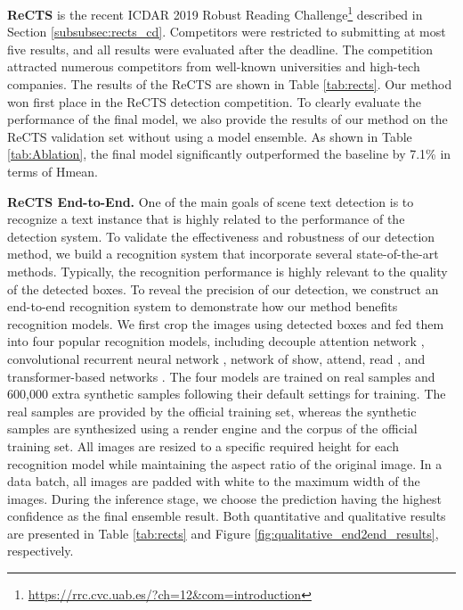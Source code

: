   {\bf ReCTS} is the recent ICDAR 2019 Robust Reading Challenge\footnote{\url{https://rrc.cvc.uab.es/?ch=12&com=introduction}} described in Section \ref{subsubsec:rects_cd}. Competitors were restricted to submitting at most five results, and all results were evaluated after the deadline. The competition attracted numerous competitors from well-known universities and high-tech companies. The results of the ReCTS are shown in Table \ref{tab:rects}. Our method won first place in the ReCTS detection competition. 
  To clearly evaluate the performance of the final model, we also provide the results of our method on the ReCTS validation set without using a model ensemble. As shown in Table \ref{tab:Ablation}, the final model significantly outperformed the baseline by 7.1\% in terms of Hmean.
  
  {\bf ReCTS End-to-End.} One of the main goals of scene text detection is to recognize a text instance \cite{xie2019convolutional} that is highly related to the performance of the detection system. To validate the effectiveness and robustness of our detection method, we build  a recognition system that incorporate several state-of-the-art methods. 
  Typically, the recognition performance is highly relevant to the quality of the detected boxes. To reveal the precision of our detection, we construct an end-to-end recognition system to demonstrate how our method benefits recognition models. We first crop the images using detected boxes and fed them into four popular recognition models, including decouple attention network \cite{wang2020Decoupled}, convolutional recurrent neural network \cite{shi2017end}, network of show, attend, read \cite{li2019show}, and transformer-based networks \cite{wang2019Simple}. The four models 
  are
  trained on real samples and 600,000 extra synthetic samples following their default settings for training. The real samples are provided by the official training set, whereas the synthetic samples are synthesized using a render engine \cite{jaderberg2016reading} and the corpus of the official training set. All images are resized to a specific required height for each recognition model while maintaining the aspect ratio of the original image. In a data batch, all images are padded with white to the maximum width of the images. During the inference stage, we choose the prediction having the highest confidence as the final ensemble result. Both quantitative and qualitative results are presented in Table \ref{tab:rects} and Figure \ref{fig:qualitative_end2end_results}, respectively. 
   
